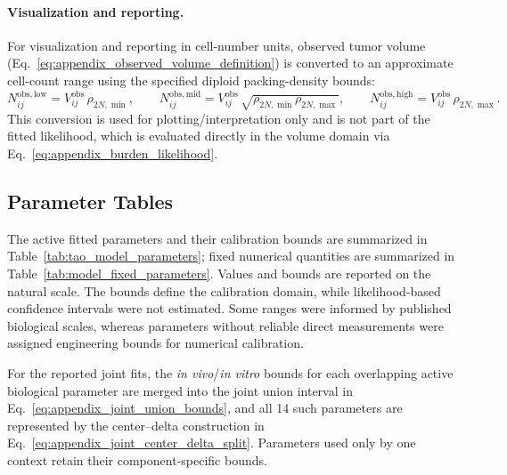 \documentclass[11pt]{article}
\begin{document}
\paragraph{Visualization and reporting.}

For visualization and reporting in cell-number units, observed tumor volume (Eq.~\eqref{eq:appendix_observed_volume_definition}) is converted to an approximate cell-count range using the specified diploid packing-density bounds:
\begin{equation}
N^{\mathrm{obs,low}}_{ij}
=
V^{\mathrm{obs}}_{ij}\,\rho_{2N,\min},
\qquad
N^{\mathrm{obs,mid}}_{ij}
=
V^{\mathrm{obs}}_{ij}\,\sqrt{\rho_{2N,\min}\rho_{2N,\max}},
\qquad
N^{\mathrm{obs,high}}_{ij}
=
V^{\mathrm{obs}}_{ij}\,\rho_{2N,\max}.
\label{eq:appendix_obs_volume_to_cells}
\end{equation}
This conversion is used for plotting/interpretation only and is not part of the fitted likelihood, which is evaluated directly in the volume domain via Eq.~\eqref{eq:appendix_burden_likelihood}.

\subsection{Parameter Tables}

The active fitted parameters and their calibration bounds are summarized in Table~\ref{tab:tao_model_parameters}; fixed numerical quantities are summarized in Table~\ref{tab:model_fixed_parameters}. Values and bounds are reported on the natural scale. The bounds define the calibration domain, while likelihood-based confidence intervals were not estimated. Some ranges were informed by published biological scales, whereas parameters without reliable direct measurements were assigned engineering bounds for numerical calibration.

For the reported joint fits, the \textit{in vivo}/\textit{in vitro} bounds for each overlapping active biological parameter are merged into the joint union interval in Eq.~\eqref{eq:appendix_joint_union_bounds}, and all 14 such parameters are represented by the center--delta construction in Eq.~\eqref{eq:appendix_joint_center_delta_split}. Parameters used only by one context retain their component-specific bounds.


\clearpage



\clearpage



\clearpage

\printbibliography
\end{document}
